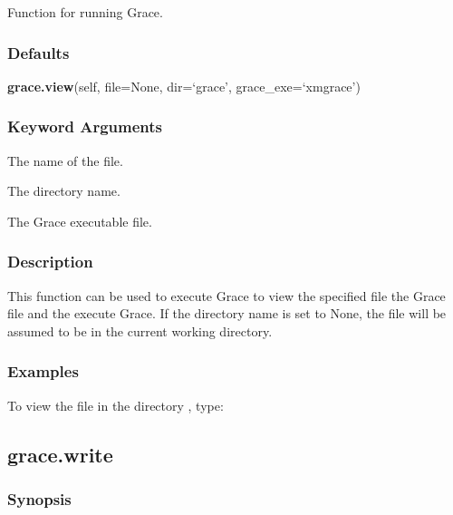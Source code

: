 Function for running Grace.



\subsubsection{Defaults}

\textsf{\textbf{grace.view}(self, file=None, dir=`grace', grace\_exe=`xmgrace')}


\subsubsection{Keyword Arguments}

  The name of the file. 

  The directory name. 

  The Grace executable file. 




\subsubsection{Description}

This function can be used to execute Grace to view the specified file the Grace  file and the execute Grace. If the directory name is set to None, the file will be assumed to be in the current working directory.



\subsubsection{Examples}

To view the file  in the directory , type:






\newpage

\subsection{grace.write}


\subsubsection{Synopsis}

